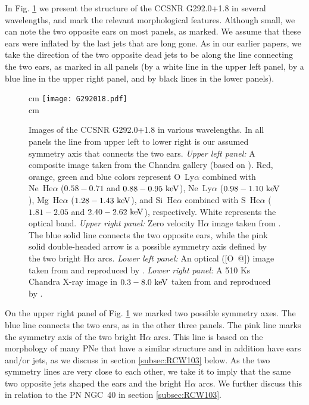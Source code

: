 \documentclass[12pt,preprint,a4paper]{aastex}
\makeatletter
\def \keV{~\rm{keV}}
\newcommand*{\rom}[1]{\expandafter\@slowromancap\romannumeral #1@}
\makeatother
\begin{document}
In Fig. \ref{G292.0+1.8} we present the structure of the CCSNR G292.0+1.8 in several wavelengths, and mark the relevant morphological features. 
Although small, we can note the two opposite ears on most panels, as marked. We assume that these ears were inflated by the last jets that are long gone. As in our earlier papers, we take the direction of the two opposite dead jets to be along the line connecting the two ears, as marked in all panels (by a white line in the upper left panel, by a blue line in the upper right panel, and by black lines in the lower panels).
\begin{figure} %
\centering
{} cm
\texttt{[image: G292018.pdf]}\\
 cm
\caption{Images of the CCSNR G292.0+1.8 in various wavelengths. In all panels the line from upper left to lower right is our assumed symmetry axis that connects the two ears.
    \textit{Upper left panel:} A composite image taken from the Chandra gallery (based on \citealt{Parketal2007}). Red, orange, green and blue colors represent O~Ly$\alpha$ combined with Ne~He$\alpha$ ($0.58 - 0.71$ and $0.88 - 0.95 \keV$), Ne~Ly$\alpha$ ($0.98 - 1.10 \keV$), Mg~He$\alpha$ ($1.28-1.43 \keV$), and Si~He$\alpha$ combined with S~He$\alpha$ ($1.81 - 2.05$ and $2.40 - 2.62 \keV$), respectively. White represents the optical band.   
    \textit{Upper right panel:} Zero velocity H$\alpha$ image taken from \cite{Ghavamian2005}. The blue solid line connects the two opposite ears, while the pink solid double-headed arrow is a possible symmetry axis defined by the two bright H$\alpha$ arcs. 
    \textit{Lower left panel:} An optical ([O~\rom{3}]) image taken from \cite{WinklerLong2006} and reproduced by \cite{Ghavamian2012}. 
    \textit{Lower right panel:} A 510 Ks Chandra X-ray image in $0.3-8.0 \keV$ taken from \cite{Parketal2007} and reproduced by \cite{Ghavamian2012}.} 
\label{G292.0+1.8}
\end{figure}
 
 On the upper right panel of Fig. \ref{G292.0+1.8} we marked two possible symmetry axes. The blue line connects the two ears, as in the other three panels. The pink line marks the symmetry axis of the two bright H$\alpha$ arcs. This line is based on the morphology of many PNe that have a similar structure and in addition have ears and/or jets, as we discuss in section \ref{subsec:RCW103} below. As the two symmetry lines are very close to each other, we take it to imply that the same two opposite jets shaped the ears and the bright H$\alpha$ arcs. We further discuss this in relation to the PN NGC~40 in section \ref{subsec:RCW103}. 
 
\end{document}
